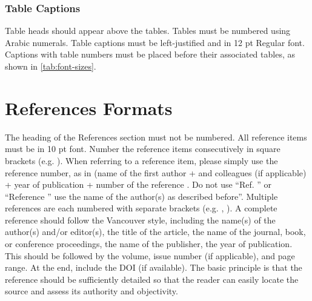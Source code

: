 \documentclass[12pt, twocolumn, a4paper]{article}
\begin{document}
\subsubsection{Table Captions}
Table heads should appear above the tables. Tables must be numbered using Arabic numerals. Table captions must be left-justified and in 12 pt Regular font. Captions with table numbers must be placed before their associated tables, as shown in \autoref{tab:font-sizes}.

\section{References Formats}
The heading of the References section must not be numbered. All reference items must be in 10 pt font. Number the reference items consecutively in square brackets (e.g. \cite{fogg2003}). When referring to a reference item, please simply use the reference number, as in (name of the first author + and colleagues (if applicable) + year of publication + number of the reference \cite{hirsh2002}.  Do not use “Ref. \cite{eckes2000}” or “Reference \cite{eckes2000}” use the name of the author(s) as described before”.  Multiple references are each numbered with separate brackets (e.g. \cite{fogg2003}, \cite{hirsh2002,eckes2000}).
A complete reference should follow the Vancouver style, including the name(s) of the author(s) and/or editor(s), the title of the article, the name of the journal, book, or conference proceedings, the name of the publisher, the year of publication. This should be followed by the volume, issue number (if applicable), and page range. At the end, include the DOI (if available).
The basic principle is that the reference should be sufficiently detailed so that the reader can easily locate the source and assess its authority and objectivity.
\end{document}
